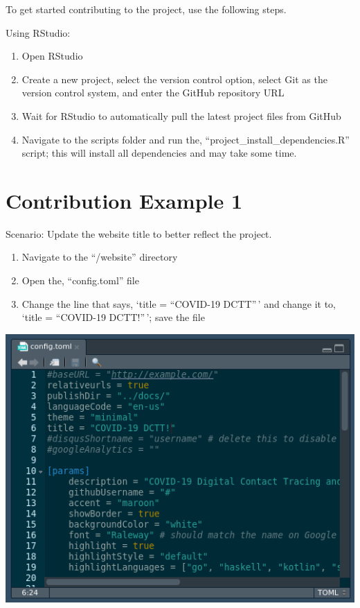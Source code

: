 \documentclass[
]{book}
\providecommand{\tightlist}{%
  \setlength{\itemsep}{0pt}\setlength{\parskip}{0pt}}
\begin{document}
To get started contributing to the project, use the following steps.

Using RStudio:

\begin{enumerate}
\def\labelenumi{\arabic{enumi}.}
\tightlist
\item
  Open RStudio
\item
  Create a new project, select the version control option, select Git as the version control system, and enter the GitHub repository URL
\item
  Wait for RStudio to automatically pull the latest project files from GitHub
\item
  Navigate to the scripts folder and run the, ``project\_install\_dependencies.R'' script; this will install all dependencies and may take some time.
\end{enumerate}

\hypertarget{contribution-example-1}{%
\section{Contribution Example 1}\label{contribution-example-1}}

Scenario: Update the website title to better reflect the project.

\begin{enumerate}
\def\labelenumi{\arabic{enumi}.}
\tightlist
\item
  Navigate to the ``/website'' directory
\item
  Open the, ``config.toml'' file
\item
  Change the line that says, `title = ``COVID-19 DCTT''\,' and change it to, `title = ``COVID-19 DCTT!''\,'; save the file
\end{enumerate}

\includegraphics{images/04-example1_1.png}
\end{document}
